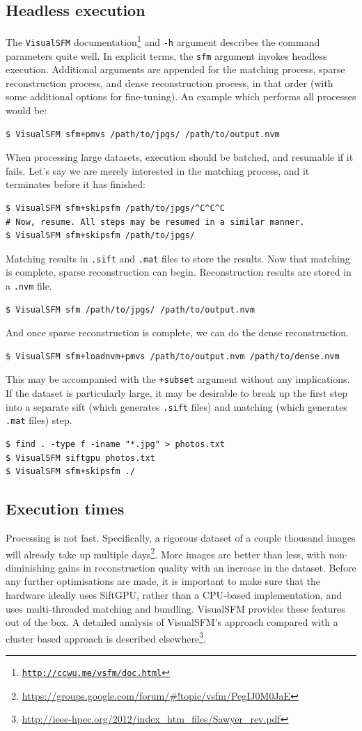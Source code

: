 \subsection{Headless execution}
The {\tt VisualSFM} documentation\footnote{{\tt \url{http://ccwu.me/vsfm/doc.html}}} and {\tt -h} argument describes the command parameters quite well. In explicit terms, the {\tt sfm} argument invokes headless execution. Additional arguments are appended for the matching process, sparse reconstruction process, and dense reconstruction process, in that order (with some additional options for fine-tuning). An example which performs all processes would be:
\begin{lstlisting}
$ VisualSFM sfm+pmvs /path/to/jpgs/ /path/to/output.nvm
\end{lstlisting}
When processing large datasets, execution should be batched, and resumable if it fails. Let's say we are merely interested in the matching process, and it terminates before it has finished:
\begin{lstlisting}
$ VisualSFM sfm+skipsfm /path/to/jpgs/^C^C^C
# Now, resume. All steps may be resumed in a similar manner.
$ VisualSFM sfm+skipsfm /path/to/jpgs/
\end{lstlisting}
Matching results in {\tt *.sift} and {\tt *.mat} files to store the results. Now that matching is complete, sparse reconstruction can begin. Reconstruction results are stored in a {\tt .nvm} file.
\begin{lstlisting}
$ VisualSFM sfm /path/to/jpgs/ /path/to/output.nvm
\end{lstlisting}
And once sparse reconstruction is complete, we can do the dense reconstruction.
\begin{lstlisting}
$ VisualSFM sfm+loadnvm+pmvs /path/to/output.nvm /path/to/dense.nvm
\end{lstlisting}
This may be accompanied with the {\tt +subset} argument without any implications.
If the dataset is particularly large, it may be desirable to break up the first step into a separate sift (which generates {\tt .sift} files) and matching (which generates {\tt .mat} files) step.
\begin{lstlisting}
$ find . -type f -iname "*.jpg" > photos.txt
$ VisualSFM siftgpu photos.txt
$ VisualSFM sfm+skipsfm ./
\end{lstlisting}
\subsection{Execution times}
Processing is not fast. Specifically, a rigorous dataset of a couple thousand images will already take up multiple days\footnote{\url{https://groups.google.com/forum/\#!topic/vsfm/PegIJ0M0JaE}}. More images are better than less, with non-diminishing gains in reconstruction quality with an increase in the dataset. Before any further optimisations are made, it is important to make sure that the hardware ideally uses SiftGPU, rather than a CPU-based implementation, and uses multi-threaded matching and bundling. VisualSFM provides these features out of the box. A detailed analysis of VisualSFM's approach compared with a cluster based approach is described elsewhere\footnote{\url{http://ieee-hpec.org/2012/index\_htm\_files/Sawyer\_rev.pdf}}.

